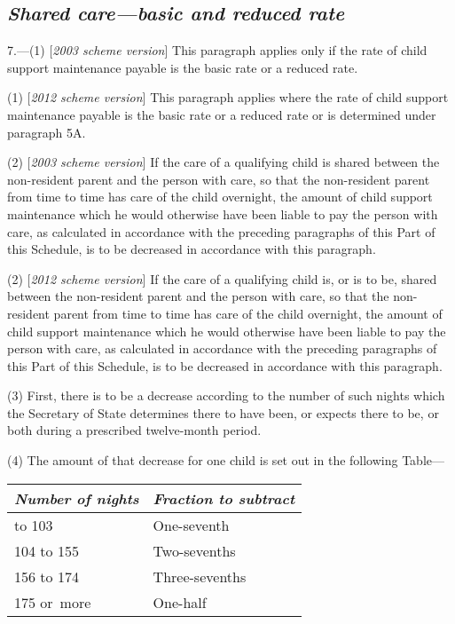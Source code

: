 \documentclass[12pt,a4paper]{article}
\begin{document}
\subsection*{\itshape Shared care—basic and reduced rate}

7.---(1) [\emph{2003 scheme version}] This paragraph applies only if the rate of child support maintenance payable is the basic rate or a reduced rate.

(1) [\emph{2012 scheme version}] This paragraph applies where the rate of child support maintenance payable is the basic rate or a reduced rate or is determined under paragraph 5A.

(2) [\emph{2003 scheme version}] If the care of a qualifying child is shared between the non-resident parent and the person with care, so that the non-resident parent from time to time has care of the child overnight, the amount of child support maintenance which he would otherwise have been liable to pay the person with care, as calculated in accordance with the preceding paragraphs of this Part of this Schedule, is to be decreased in accordance with this paragraph.

(2) [\emph{2012 scheme version}] 
If the care of a qualifying child is, or is to be, shared  %
between the non-resident parent and the person with care, so that the non-resident parent from time to time has care of the child overnight, the amount of child support maintenance which he would otherwise have been liable to pay the person with care, as calculated in accordance with the preceding paragraphs of this Part of this Schedule, is to be decreased in accordance with this paragraph.

(3) First, there is to be a decrease according to the number of such nights which the 
Secretary of State  %
determines there to have been, or expects there to be, or both during a prescribed twelve-month period.

(4) The amount of that decrease for one child is set out in the following Table—

\medskip

{\footnotesize\noindent
\begin{longtable}{ll}
\hline
\itshape Number of nights	& \itshape Fraction to subtract\\
\hline
\endhead
\hline
\endlastfoot
52 to 103	&One-seventh\\
104 to 155	&Two-sevenths\\
156 to 174	&Three-sevenths\\
175 or~more	&One-half\\
\end{longtable}

}
\end{document}
